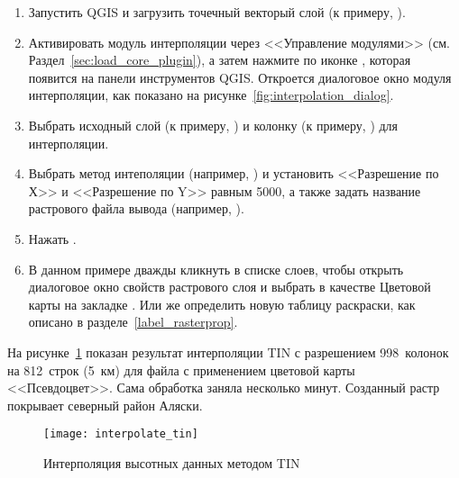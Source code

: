 \label{interpolation_usage}

\begin{enumerate}
  \item Запустить QGIS и загрузить точечный векторый слой (к примеру,
  ).
  \item Активировать модуль интерполяции через <<Управление модулями>>
  (см. Раздел~\ref{sec:load_core_plugin}), а затем нажмите по иконке
  , которая появится на панели
  инструментов QGIS. Откроется диалоговое окно модуля интерполяции, как
  показано на рисунке~\ref{fig:interpolation_dialog}.
  \item Выбрать исходный слой (к примеру, )
  и колонку (к примеру, ) для интерполяции.
  \item Выбрать метод интеполяции (например,
  ) и установить <<Разрешение по Х>>
  и <<Разрешение по Y>> равным 5000, а также задать название растрового
  файла вывода (например, ).
  \item Нажать .
  \item В данном примере дважды кликнуть 
  в списке слоев, чтобы открыть диалоговое окно свойств растрового слоя
  и выбрать  в качестве Цветовой
  карты на закладке . Или же определить новую таблицу
  раскраски, как описано в разделе~\ref{label_rasterprop}.
\end{enumerate}

На рисунке~\ref{fig:interpolation_idw} показан результат интерполяции
TIN с разрешением 998~колонок на 812~строк (5~км) для файла
 с применением цветовой карты <<Псевдоцвет>>. Сама
обработка заняла несколько минут. Созданный растр покрывает северный район Аляски.

\begin{figure}[ht]
   \centering
   \texttt{[image: interpolate\_tin]}
   \caption{Интерполяция высотных данных методом TIN \wincaption}\label{fig:interpolation_idw}
\end{figure}

\FloatBarrier
